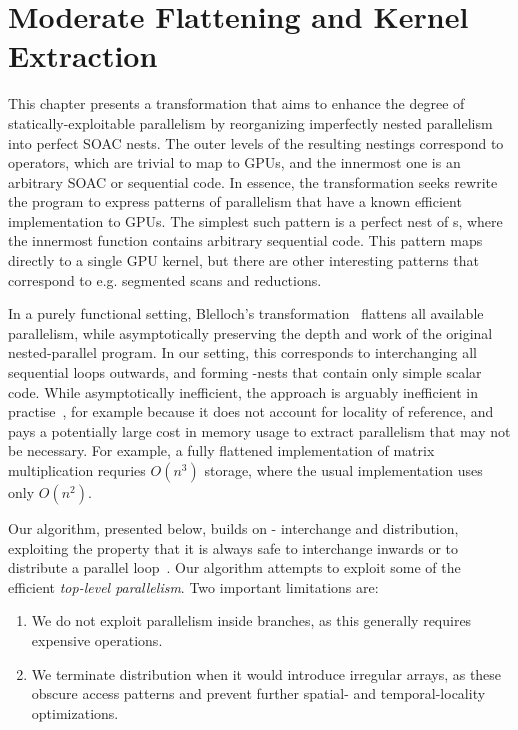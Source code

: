 \renewcommand{\G}[1]{G#1}

\chapter{Moderate Flattening and Kernel Extraction}
\label{chap:kernel-extraction}

This chapter presents a transformation that aims to enhance the degree
of statically-exploitable parallelism by reorganizing imperfectly
nested parallelism into perfect SOAC nests.  The outer levels of the
resulting nestings correspond to  operators, which are trivial
to map to GPUs, and the innermost one is an arbitrary SOAC or
sequential code.  In essence, the transformation seeks rewrite the
program to express patterns of parallelism that have a known efficient
implementation to GPUs.  The simplest such pattern is a perfect nest
of s, where the innermost function contains arbitrary
sequential code.  This pattern maps directly to a single GPU kernel,
but there are other interesting patterns that correspond to
e.g. segmented scans and reductions.

In a purely functional setting, Blelloch's
transformation~\cite{blelloch1990vector} flattens all available
parallelism, while asymptotically preserving the depth and work of the
original nested-parallel program.  In our setting, this corresponds to
interchanging all sequential loops outwards, and forming
-nests that contain only simple scalar code.  While
asymptotically inefficient, the approach is arguably inefficient in
practise~\cite{bergstrom2012nested}, for example because it does not
account for locality of reference, and pays a potentially large cost
in memory usage to extract parallelism that may not be necessary.  For
example, a fully flattened implementation of matrix multiplication
requries $O(n^{3})$ storage, where the usual implementation uses only
$O(n^{2})$.

Our algorithm, presented below, builds on -
interchange and  distribution, exploiting the property that it
is always safe to interchange inwards or to distribute a parallel
loop~\cite{Allen-Kennedy2002}.  Our algorithm attempts to exploit some
of the efficient \textit{top-level parallelism}.  Two important
limitations are:

\begin{enumerate}
\item We do not exploit parallelism inside  branches, as this
  generally requires expensive  operations.
\item We terminate distribution when it would introduce irregular
  arrays, as these obscure access patterns and prevent further
  spatial- and temporal-locality optimizations.
\end{enumerate}

